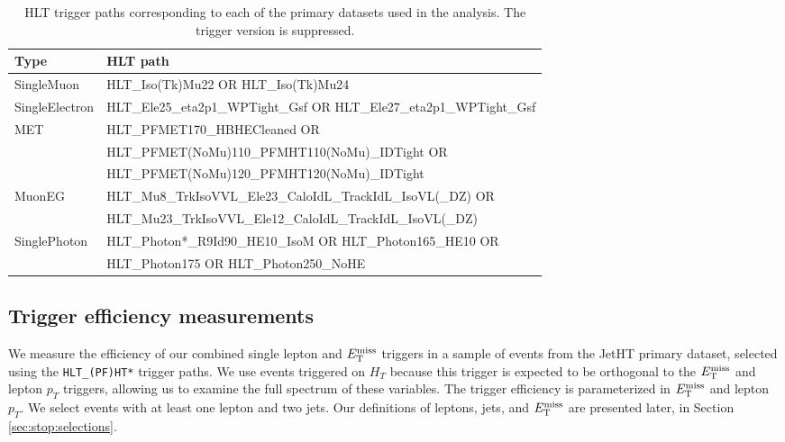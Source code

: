 \begin{table}[htb]
\caption{HLT trigger paths corresponding to each of the primary
  datasets used in the analysis. The trigger version is suppressed.}
\label{tab:stop:trigs}
\centering
\footnotesize
\begin{tabular}{|l|l|}
\hline
Type & HLT path \\
\hline
SingleMuon & HLT\_Iso(Tk)Mu22 OR HLT\_Iso(Tk)Mu24 \\
SingleElectron & HLT\_Ele25\_eta2p1\_WPTight\_Gsf OR HLT\_Ele27\_eta2p1\_WPTight\_Gsf \\
\hline
\multirow{3}{*}{MET} & HLT\_PFMET170\_HBHECleaned OR \\
 & HLT\_PFMET(NoMu)110\_PFMHT110(NoMu)\_IDTight OR \\
 & HLT\_PFMET(NoMu)120\_PFMHT120(NoMu)\_IDTight \\
\hline
\hline
\multirow{2}{*}{MuonEG} & HLT\_Mu8\_TrkIsoVVL\_Ele23\_CaloIdL\_TrackIdL\_IsoVL(\_DZ) OR \\ 
 & HLT\_Mu23\_TrkIsoVVL\_Ele12\_CaloIdL\_TrackIdL\_IsoVL(\_DZ) \\
\hline
\multirow{2}{*}{SinglePhoton} & HLT\_Photon*\_R9Id90\_HE10\_IsoM OR HLT\_Photon165\_HE10 OR \\
 & HLT\_Photon175 OR HLT\_Photon250\_NoHE \\
\hline
\end{tabular}
\end{table}

\subsection{Trigger efficiency measurements}
\label{ssec:stop:trigeff}

We measure the efficiency of our combined single lepton and $E_\text{T}^\text{miss}$
triggers in a sample of events from the JetHT primary dataset,
selected using the \verb+HLT_(PF)HT*+ trigger paths. We use events
triggered on $H_T$ because this trigger is expected to be orthogonal
to the $E_\text{T}^\text{miss}$ and lepton $p_T$ triggers, allowing us to examine the full %
spectrum of these variables. The trigger
efficiency is parameterized in $E_\text{T}^\text{miss}$ and lepton $p_T$. We select events
with at least one lepton and two jets. Our definitions of leptons,
jets, and $E_\text{T}^\text{miss}$ are presented later, in Section
\ref{sec:stop:selections}.

